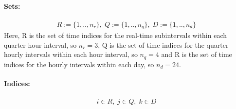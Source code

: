\documentclass[11pt,twoside]{article}
\begin{document}
\paragraph{Sets:}
\begin{subequations}
\begin{align}
R := \{1,..,n_r\},\; Q :=  \{1,..,n_q\},\; D :=  \{1,..,n_d\}
\end{align}
\end{subequations}
Here, R is the set of time indices for the real-time subintervals within each quarter-hour interval, so $n_r=3$, Q is the set of time indices for the quarter-hourly intervals within each hour interval, so $n_q=4$ and R is the set of time indices for the hourly intervals within each day, so $n_d=24$.\\
\paragraph{Indices:}
\begin{subequations}
\begin{align}
i \in R, \; j \in Q, \; k \in D
\end{align}
\end{subequations}
\end{document}
